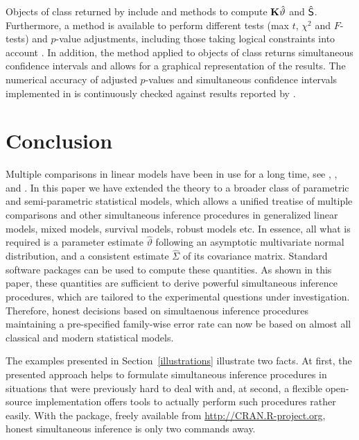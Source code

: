 \documentclass[12pt]{article}
\begin{document}
Objects of class  returned by  include
 and  methods to compute
$\K \hat{\vartheta}$ and $\hat{\S}$. Furthermore, a  method
is available to perform different tests (max $t$, $\chi^2$ and
$F$-tests) and $p$-value adjustments, including those taking
logical constraints into account \citep{Shaffer1986, Westfall1997}.
In addition, the  method applied to objects of class
 returns simultaneous confidence intervals and allows
for a graphical representation of the results. The numerical 
accuracy of adjusted $p$-values and
simultaneous confidence intervals implemented in 
is continuously checked against results reported by
\cite{Westfall1999}.





\section{Conclusion}

Multiple comparisons in linear models have been in use for a long time,
see \cite{HochbergTamhane1987}, \cite{Hsu1996}, and \cite{Bretzetal2008}.
In this paper we have extended the theory to a broader class
of parametric and semi-parametric statistical models, which allows a unified treatise of
multiple comparisons and other simultaneous inference procedures 
in generalized linear models, mixed models, survival models, robust models etc.
In essence, all what is required is a parameter estimate
$\hat{\vartheta}$ following an asymptotic multivariate normal distribution,
and a consistent estimate $\hat{\Sigma}$ of its covariance matrix.
Standard software packages can be used to compute these quantities.
As shown in this paper, these quantities are sufficient to derive
powerful simultaneous inference procedures, which are tailored to the 
experimental questions under investigation. Therefore, honest decisions
based on simultaenous inference procedures maintaining a pre-specified 
family-wise error rate can now be based on almost all classical
and modern statistical models.

The examples presented in Section~\ref{illustrations} illustrate two facts.
At first, the presented approach helps to formulate simultaneous
inference procedures in situations that were previously hard to deal
with and, at second, a flexible open-source implementation offers tools
to actually perform such procedures rather easily. With the
 package, freely available from
\url{http://CRAN.R-project.org}, honest simultaneous inference 
is only two commands away.



\end{document}
